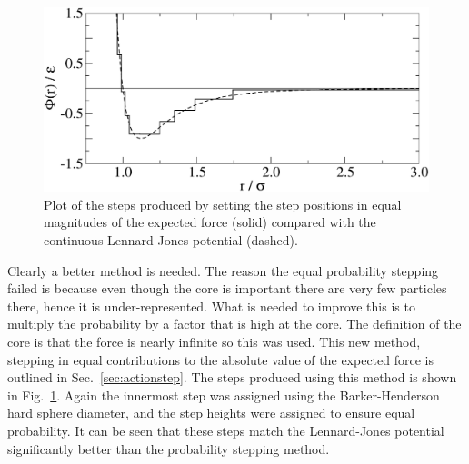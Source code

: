 \documentclass[12pt]{UoAthesis} \usepackage{booktabs}
\begin{document}
\begin{figure}[htp] 
  \begin{center}
    \includegraphics[clip,scale=0.45]{figures/actionSteps} 
    \caption[Steps produced using equal magnitudes of the expected
    force compared with the continuous potential]
    {Plot of the steps produced by setting the step positions in equal
      magnitudes of the expected force (solid) compared with the
      continuous Lennard-Jones potential (dashed).}
    \label{fig:actionSteps}
  \end{center}
\end{figure}
Clearly a better method is needed.  The reason the equal probability
stepping failed is because even though the core is important there are
very few particles there, hence it is under-represented.  What is
needed to improve this is to multiply the probability by a factor that
is high at the core.  The definition of the core is that the force is
nearly infinite so this was used.  This new method, stepping in equal
contributions to the absolute value of the expected force is outlined
in Sec.~\ref{sec:actionstep}.  The steps produced using this method
is shown in Fig.~\ref{fig:actionSteps}. Again the innermost step was
assigned using the Barker-Henderson hard sphere diameter, and the step
heights were assigned to ensure equal probability.  It can be seen
that these steps match the Lennard-Jones potential significantly
better than the probability stepping method.
\end{document}
